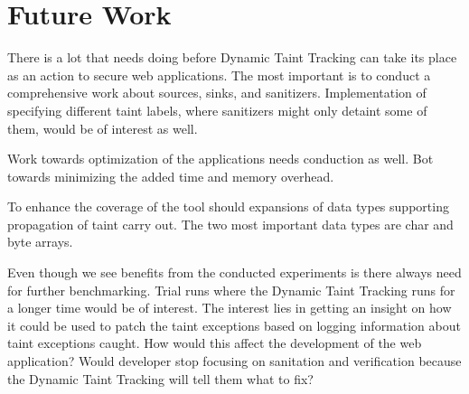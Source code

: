 \chapter{Future Work}
There is a lot that needs doing before Dynamic Taint Tracking can take its place as an action to secure web applications. The most important is to conduct a comprehensive work about sources, sinks, and sanitizers. Implementation of specifying different taint labels, where sanitizers might only detaint some of them, would be of interest as well.

Work towards optimization of the applications needs conduction as well. Bot towards minimizing the added time and memory overhead.

To enhance the coverage of the tool should expansions of data types supporting propagation of taint carry out. The two most important data types are char and byte arrays. 

Even though we see benefits from the conducted experiments is there always need for further benchmarking. Trial runs where the Dynamic Taint Tracking runs for a longer time would be of interest. The interest lies in getting an insight on how it could be used to patch the taint exceptions based on logging information about taint exceptions caught. How would this affect the development of the web application? Would developer stop focusing on sanitation and verification because the Dynamic Taint Tracking will tell them what to fix?